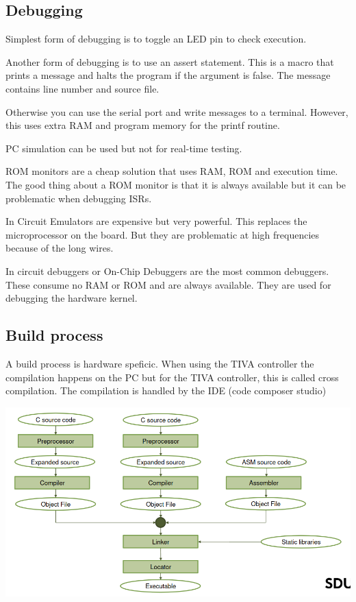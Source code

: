\subsection{Debugging}
Simplest form of debugging is to toggle an LED pin to check execution.

Another form of debugging is to use an assert statement. This
is a macro that prints a message and halts the program if the
argument is false. The message contains line number and source file.

Otherwise you can use the serial port and write messages to a terminal.
However, this uses extra RAM and program memory for the printf routine.

PC simulation can be used but not for real-time testing.

ROM monitors are a cheap solution that uses RAM, ROM and execution time.
The good thing about a ROM monitor is that it is always available
but it can be problematic when debugging ISRs.

In Circuit Emulators are expensive but very powerful. This replaces the
microprocessor on the board. But they are problematic at high frequencies
because of the long wires.

In circuit debuggers or On-Chip Debuggers are the most common debuggers.
These consume no RAM or ROM and are always available. They are used
for debugging the hardware kernel.



\subsection{Build process}

A build process is hardware speficic. When using the TIVA controller
the compilation happens on the PC but for the TIVA controller, this
is called cross compilation. The compilation is handled by the IDE
(code composer studio)

\begin{center}
	\includegraphics[width=\textwidth]{images/build.png}
\end{center}


